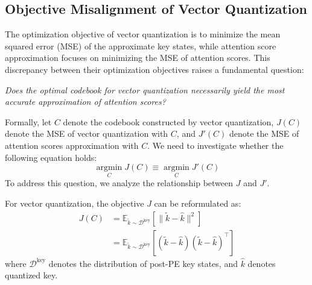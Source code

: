 \subsection{Objective Misalignment of Vector Quantization}

\label{sec:objective_mismatch}

The optimization objective of vector quantization is to minimize the mean squared error (MSE) of the approximate key states, while attention score approximation focuses on minimizing the MSE of attention scores.
This discrepancy between their optimization objectives raises a fundamental question:

\textit{Does the optimal codebook for vector quantization necessarily yield the most accurate approximation of attention scores?}

Formally, let $C$ denote the codebook constructed by vector quantization, \( J(C) \) denote the MSE of vector quantization with \(C\), and \( J'(C) \) denote the MSE of attention scores approximation with \(C\).
We need to investigate whether the following equation holds:
\begin{equation}
    \operatorname*{argmin}_C J(C) \equiv \operatorname*{argmin}_C J'(C)
\end{equation}
To address this question, we analyze the relationship between \( J \) and \( J' \).

For vector quantization, the objective \(J\) can be reformulated as:
\begin{equation}
    \begin{aligned}
        J(C) & = \mathbb E_{\tilde k \sim \mathcal D^{\mathrm{key}}} [ \| \tilde k - \hat k \|^2 ] \\
        & = \mathbb E_{\tilde k \sim \mathcal D^{\mathrm{key}}} [ ( \tilde k - \hat k)( \tilde k - \hat k)^\top ]
    \end{aligned}
\end{equation}
where \(\mathcal D^{\mathrm{key}}\) denotes the distribution of post-PE key states, and \(\hat k\) denotes quantized key.

